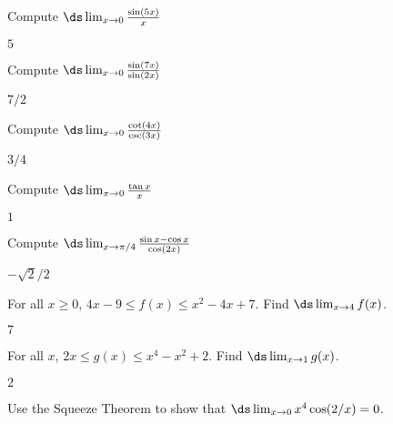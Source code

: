 \begin{exercises}

\twocol

\begin{exercise} Compute $\ds\lim_{x\to 0} {\sin (5x)\over x}$
\begin{answer} $5$
\end{answer}\end{exercise}



\begin{exercise} Compute $\ds\lim_{x\to 0 } {\sin(7x)\over\sin (2x)}$
\begin{answer} $7/2$
\end{answer}\end{exercise}

\begin{exercise}  Compute $\ds\lim_{x\to 0 } {\cot (4x) \over\csc (3x)}$
\begin{answer} $3/4$
\end{answer}\end{exercise}

\begin{exercise} Compute $\ds\lim_{x\to 0 } {\tan x\over x}$
\begin{answer} $1$
\end{answer}\end{exercise}

\endtwocol

\begin{exercise} Compute $\ds\lim_{x\to \pi/4} {\sin x
    -\cos x \over\cos (2x)}$
 \begin{answer} $-\sqrt2/2$
\end{answer}\end{exercise}

\begin{exercise}  For all $x\geq 0$, $4x-9 \leq f(x) \leq x^2 - 4x +7$. Find
  $\ds\lim_{x\to4}f(x)$.
\begin{answer} $7$
\end{answer}\end{exercise}

\begin{exercise}  For all $x$, $2x \leq g(x) \leq x^4 - x^2 +2$. Find
  $\ds\lim_{x\to1}g(x)$.
\begin{answer} $2$
\end{answer}\end{exercise}

\begin{exercise} Use the Squeeze Theorem to show that $\ds\lim_{x\to0} x^4
 \cos(2/x)=0$.
\end{exercise}

\end{exercises}
